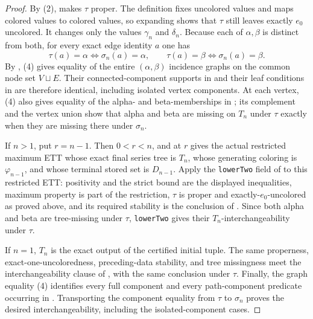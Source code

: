 \begin{proof}
By (2),  makes $\tau$ proper.  The
definition  fixes uncolored values and
maps colored values to colored values, so expanding
 shows that $\tau$ still leaves exactly
$e_0$ uncolored.  It changes only the values $\gamma_n$ and $\delta_n$.
Because each of $\alpha,\beta$ is distinct from both, for every exact edge
identity $a$ one has
\[
 \tau(a)=\alpha\Longleftrightarrow\sigma_n(a)=\alpha,
 \qquad
 \tau(a)=\beta\Longleftrightarrow\sigma_n(a)=\beta.             \tag{4}
\]
By , (4) gives equality of the entire
$(\alpha,\beta)$ incidence graphs on the common node set $V\sqcup E$.
Their connected-component supports in  and
their leaf conditions in  are therefore
identical, including isolated vertex components.  At each vertex, (4) also
gives equality of the alpha- and beta-memberships in
; its complement  and the
vertex union  show that alpha and beta are
missing on $T_n$ under $\tau$ exactly when they are missing there under
$\sigma_n$.

If $n>1$, put $r=n-1$.  Then $0<r<n$, and
 at $r$ gives the actual restricted
maximum ETT whose exact final series tree is $T_n$, whose generating
coloring is $\varphi_{n-1}$, and whose terminal stored set is
$D_{n-1}$.  Apply the \texttt{lowerTwo} field of
 to this restricted ETT: positivity
and the strict bound are the displayed inequalities, maximum property is
part of the restriction, $\tau$ is proper and exactly-$e_0$-uncolored as
proved above, and its required stability is the conclusion of
.  Since both alpha and beta are
tree-missing under $\tau$, \texttt{lowerTwo} gives their
$T_n$-interchangeability under $\tau$.

If $n=1$, $T_n$ is the exact output of the certified initial tuple.
The same properness, exact-one-uncoloredness, preceding-data stability,
and tree missingness meet the interchangeability clause of
, with the same conclusion under $\tau$.
Finally, the graph equality (4) identifies every full component and every
path-component predicate occurring in
.  Transporting the component equality from
$\tau$ to $\sigma_n$ proves the desired interchangeability, including the
isolated-component cases.
\end{proof}
